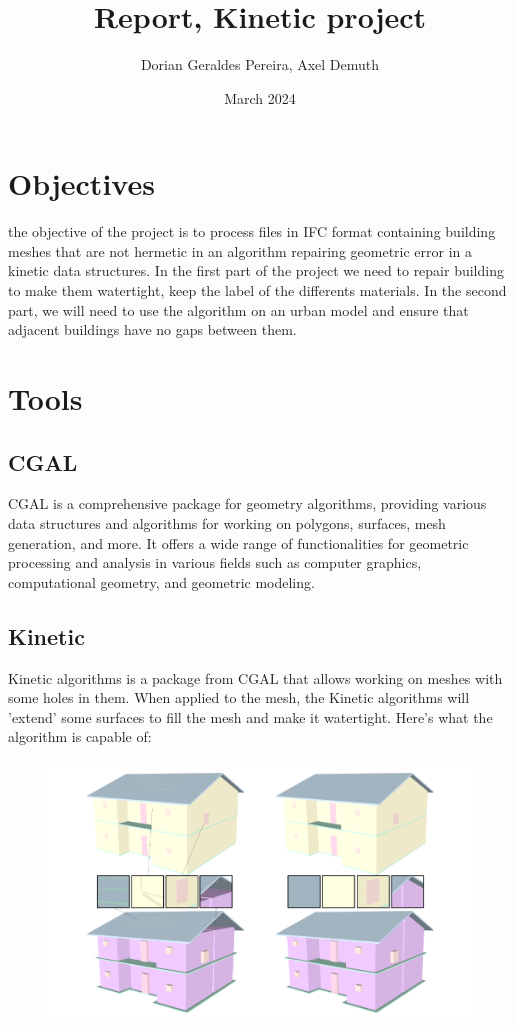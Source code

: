 \documentclass{article}
\title{Report, Kinetic project}
\author{Dorian Geraldes Pereira, Axel Demuth}
\date{March 2024}
\begin{document}
\maketitle
\tableofcontents
\newpage
\section{Objectives}
the objective of the project is to process files in IFC format containing building meshes that are not hermetic in an algorithm repairing
geometric error in a kinetic data structures.
\newline In the first part of the project we need to repair building to make them watertight, keep the label of the differents materials.
In the second part, we will need to use the algorithm on an urban model and ensure that adjacent buildings have no gaps between them. 
\section{Tools}
\subsection{CGAL}
CGAL is a comprehensive package for geometry algorithms, providing various data structures and algorithms for working on polygons, surfaces, mesh generation, and more.
It offers a wide range of functionalities for geometric processing and analysis in various fields such as computer graphics, computational geometry, and geometric modeling.
\subsection{Kinetic}

Kinetic algorithms is a package from CGAL that allows working on meshes with some holes in them. When applied to the mesh, the Kinetic algorithms will 'extend' some surfaces to fill the mesh and make it watertight. 
Here's what the algorithm is capable of:


\begin{figure}[h]
    
\includegraphics[scale =   0.3 ]{../../images/example_algorithm.png}

\end{figure}
\nocite{*}


\end{document}
